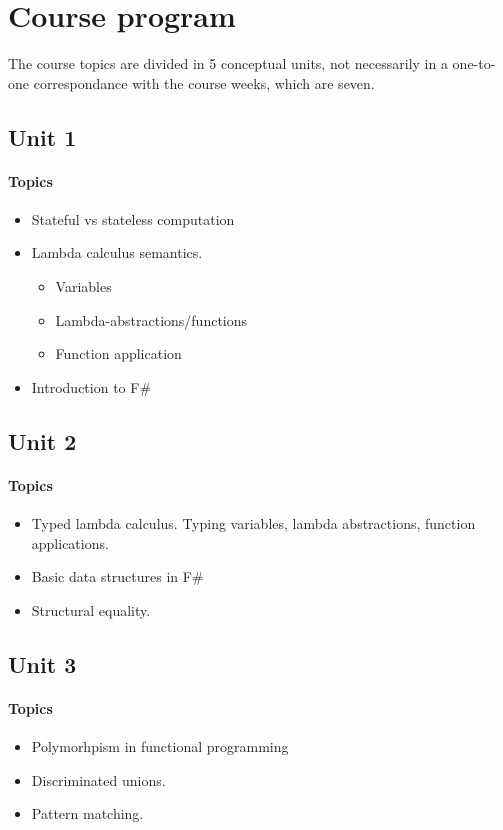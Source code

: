 \section{Course program}
The course topics are divided in 5 conceptual units, not necessarily in a one-to-one correspondance with the course weeks, which are seven.

\subsection*{Unit 1}
\paragraph*{Topics}
\begin{itemize}[noitemsep]
	\item Stateful vs stateless computation
  \item Lambda calculus semantics.
    \begin{itemize}[noitemsep]
      \item Variables
      \item Lambda-abstractions/functions
      \item Function application
    \end{itemize}	
  \item Introduction to F\#
\end{itemize}

\subsection*{Unit 2}
\paragraph*{Topics}			
\begin{itemize}[noitemsep]
	\item Typed lambda calculus. Typing variables, lambda abstractions, function applications.
  \item Basic data structures in F\#
  \item Structural equality.
\end{itemize}

\subsection*{Unit 3}
\paragraph*{Topics}			
\begin{itemize}[noitemsep]
  \item Polymorhpism in functional programming
	\item Discriminated unions.
  \item Pattern matching.
\end{itemize}

